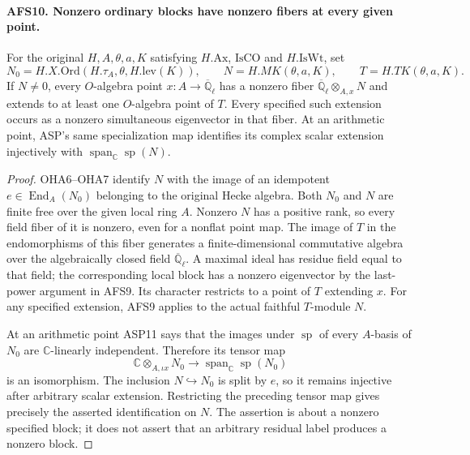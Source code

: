 \documentclass[11pt,a4paper]{article}
\numberwithin{equation}{section}
\theoremstyle{remark}\newtheorem{remark}[theorem]{Remark}
\begin{document}
\paragraph{AFS10. Nonzero ordinary blocks have nonzero fibers at every given point.}
\label{claim:AFS10}
For the original $H,A,\theta,a,K$ satisfying $H.\mathrm{Ax}$,
$\mathrm{IsCO}$ and $H.\mathrm{IsWt}$, set
\[
 N_0=H.X.\mathrm{Ord}(H.\tau_A,\theta,H.\mathrm{lev}(K)),
 \qquad N=H.MK(\theta,a,K),\qquad T=H.TK(\theta,a,K).
\]
If $N\ne0$, every $O$-algebra point $x:A\to
\overline{\mathbb Q}_\ell$ has a nonzero fiber
$\overline{\mathbb Q}_\ell\otimes_{A,x}N$ and extends to at
least one $O$-algebra point of $T$.  Every specified such
extension occurs as a nonzero simultaneous eigenvector in
that fiber.  At an arithmetic point, ASP's same specialization
map identifies its complex scalar extension injectively with
$\operatorname{span}_{\mathbb C}\operatorname{sp}(N)$.
\begin{proof}
OHA6--OHA7 identify $N$ with the image of an idempotent
$e\in\operatorname{End}_A(N_0)$ belonging to the original
Hecke algebra.  Both $N_0$ and $N$ are finite free over the
given local ring $A$.  Nonzero $N$ has a positive rank, so
every field fiber of it is nonzero, even for a nonflat point
map.  The image of $T$ in the endomorphisms of this fiber
generates a finite-dimensional commutative algebra over the
algebraically closed field $\overline{\mathbb Q}_\ell$.
A maximal ideal has residue field equal to that field;
the corresponding local block has a nonzero eigenvector
by the last-power argument in AFS9.  Its character restricts
to a point of $T$ extending $x$.  For any specified extension,
AFS9 applies to the actual faithful $T$-module $N$.

At an arithmetic point ASP11 says that the images under
$\operatorname{sp}$ of every $A$-basis of $N_0$ are
$\mathbb C$-linearly independent.  Therefore its tensor map
\[
 \mathbb C\otimes_{A,\iota x}N_0
     \longrightarrow\operatorname{span}_{\mathbb C}
                                      \operatorname{sp}(N_0)
\]
is an isomorphism.  The inclusion $N\hookrightarrow N_0$
is split by $e$, so it remains injective after arbitrary
scalar extension.  Restricting the preceding tensor map
gives precisely the asserted identification on $N$.
The assertion is about a nonzero specified block; it does
not assert that an arbitrary residual label produces a
nonzero block.
\end{proof}

\end{document}
